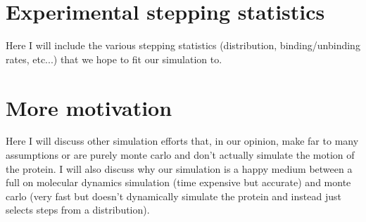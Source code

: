
\section{Experimental stepping statistics}
Here I will include the various stepping statistics (distribution, binding/unbinding rates, etc...) that we hope to fit our simulation to.


\section{More motivation} 
Here I will discuss other simulation efforts that, in our opinion, make far to many assumptions or are purely monte carlo and don't actually simulate the motion of the protein. I will also discuss why our simulation is a happy medium between a full on molecular dynamics simulation (time expensive but accurate) and monte carlo (very fast but doesn't dynamically simulate the protein and instead just selects steps from a distribution). 